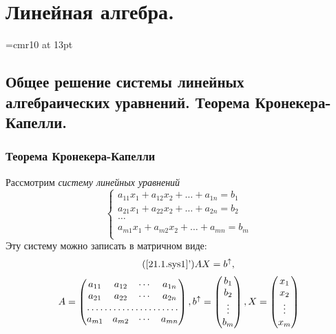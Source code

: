 \part{Линейная алгебра.}

\font\Large=cmr10 at 13pt
\newcount\rowcount{}
\def\fudge#1{\smash{\hbox{\Large#1}}}
\def\doublyso{\kern+2em\smash{\vrule height \rowcount em depth .2em}\hidewidth}			%
\chapter{Общее решение системы линейных алгебраических уравнений. Теорема Кронекера-Капелли.}
\section{Теорема Кронекера-Капелли}
  Рассмотрим \textit{систему линейных уравнений}
  \begin{equation}\label{21.1.sys1}
  \left\lbrace\begin{array}{crl}
  a_{11}x_1+a_{12}x_2+\ldots+a_{1n}=b_1\\
  a_{21}x_1+a_{22}x_2+\ldots+a_{2n}=b_2\\
  \ldots \\
  a_{m1}x_1+a_{m2}x_2+\ldots+a_{mn}=b_m\\ 
  \end{array}\right.\end{equation}
  Эту систему можно записать в матричном виде:
  \begin{equation*}\tag{\ref{21.1.sys1}'}
  AX=b^{\uparrow},
  \end{equation*}
  \begin{equation*}
  A=\begin{pmatrix}
    a_{11} & a_{12} & \cdots & a_{1n} \\
    a_{21} & a_{22} & \cdots & a_{2n} \\
    \hdotsfor{4} \\
    a_{m1} & a_{m2} & \cdots & a_{mn} \\
    \end{pmatrix},
  b^\uparrow=\begin{pmatrix}
    b_1 \\ b_2 \\ \vdots \\ b_m \\
    \end{pmatrix},
  X=\begin{pmatrix}
    x_1 \\ x_2 \\ \vdots \\ x_m \\
    \end{pmatrix}
  \end{equation*}
